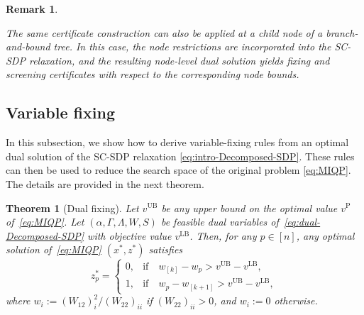\documentclass[11pt]{article}
\theoremstyle{plain}
\newtheorem{remark}{Remark}
\newtheorem{theorem}{Theorem}
\begin{document}
\begin{remark}\label{rmk:node-certificates}

The same certificate construction can also be applied at a child node of a branch-and-bound tree. In this case, the node restrictions are incorporated into the SC-SDP relaxation, and the resulting node-level dual solution yields fixing and screening certificates with respect to the corresponding node bounds.

\end{remark}

\subsection{Variable fixing}\label{subsec:variable-fixing}
In this subsection, we show how to derive variable-fixing rules from an optimal dual solution of the SC-SDP relaxation \eqref{eq:intro-Decomposed-SDP}. These rules can then be used to reduce the search space of the original problem \eqref{eq:MIQP}.
The details are provided in the next theorem. 

\begin{theorem}[Dual fixing]\label{thm:dual-fixing}
Let $v^{\mathrm{UB}}$ be any upper bound on the optimal value $v^{\mathrm{P}}$ of~\eqref{eq:MIQP}.
Let $(\alpha, \Gamma, \Lambda, W, S)$ be feasible dual variables of~\eqref{eq:dual-Decomposed-SDP}
with objective value $v^{\mathrm{LB}}$. 
Then, for any $p\in[n]$, any optimal solution of~\eqref{eq:MIQP} $(x^*,z^*)$ satisfies
\[
z_p^*=\begin{cases}
    0,&\text{if}
    \quad w_{[k]}-w_p> v^{\mathrm{UB}}-v^{\mathrm{LB}},\\
    1,& \text{if}
    \quad
    w_p-w_{[k+1]}> v^{\mathrm{UB}}-v^{\mathrm{LB}},
\end{cases}
\]
where $w_i := {(W_{12})_i^2}/{(W_{22})_{ii}}$ if $(W_{22})_{ii}>0$, and $w_i:=0$ otherwise.
\end{theorem}
\end{document}
